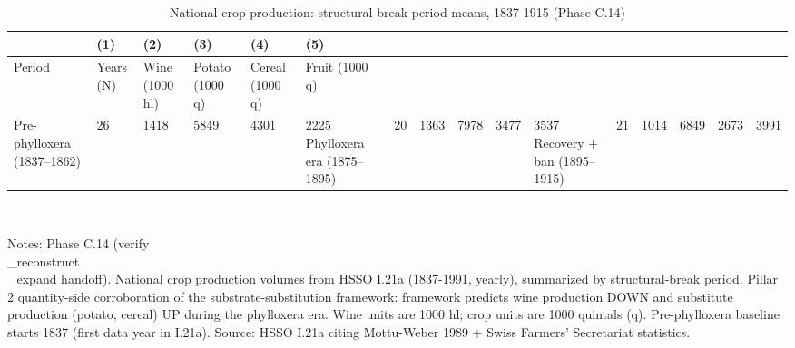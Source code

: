 \documentclass{article}
\begin{document}
\begin{table}[tbp] \centering
{}

\caption{National crop production: structural-break period means, 1837-1915 (Phase C.14)}
\label{tab:quantity_periods}
\begin{tabularx}{\linewidth}{@{}lCCCCC@{}}

\toprule
&{(1)}&{(2)}&{(3)}&{(4)}&{(5)} \tabularnewline \midrule
{Period}&{Years (N)}&{Wine (1000 hl)}&{Potato (1000 q)}&{Cereal (1000 q)}&{Fruit (1000 q)} \tabularnewline
\midrule \addlinespace[\belowrulesep]
Pre-phylloxera (1837--1862)&26&1418&5849&4301&2225
Phylloxera era (1875--1895)&20&1363&7978&3477&3537
Recovery + ban (1895--1915)&21&1014&6849&2673&3991
\bottomrule \addlinespace[\belowrulesep]

\end{tabularx}
\\ \parbox{\linewidth}{\footnotesize Notes: Phase C.14 (verify\\_reconstruct\\_expand handoff). National crop production volumes from HSSO I.21a (1837-1991, yearly), summarized by structural-break period. Pillar 2 quantity-side corroboration of the substrate-substitution framework: framework predicts wine production DOWN and substitute production (potato, cereal) UP during the phylloxera era. Wine units are 1000 hl; crop units are 1000 quintals (q). Pre-phylloxera baseline starts 1837 (first data year in I.21a). Source: HSSO I.21a citing Mottu-Weber 1989 + Swiss Farmers' Secretariat statistics.}
\end{table}
\end{document}
